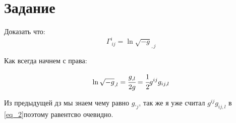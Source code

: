 \section{Задание}


Доказать что:
\begin{equation}
    \Gamma^{i}_{\ ij} = \ln \sqrt{-g}_{,j}
\end{equation}


Как всегда начнем с права:

\begin{equation}
    \ln\sqrt{-g}_{,l} = \cfrac{g_{,l}}{2g} = \cfrac{1}{2} g^{ij}g_{ij,l}
\end{equation}


Из предыдущей дз мы знаем чему равно $g_{'j}$, так же я уже считал 
$g^{ij}g_{ij,l}$ в \ref{eq_2}поэтому равентсво очевидно.